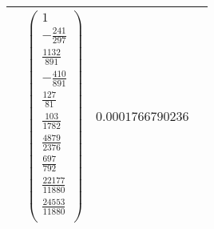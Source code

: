 \documentclass{report}
\begin{document}
\begin{tabular}{|c|c|c|c|}
           &
           $\begin{pmatrix}
              1 \\
              -\frac{241}{297} \\
              \frac{1132}{891} \\
              -\frac{410}{891} \\
              \frac{127}{81} \\
              \frac{103}{1782} \\
              \frac{4879}{2376} \\
              \frac{697}{792} \\
              \frac{22177}{11880} \\
              \frac{24553}{11880} \\
          \end{pmatrix}$
          &
          $0.0001766790236$ \\
          \hline
          \end{tabular}
        \renewcommand{\arraystretch}{1}
        \newpage
        \renewcommand{\arraystretch}{2}
\end{document}
